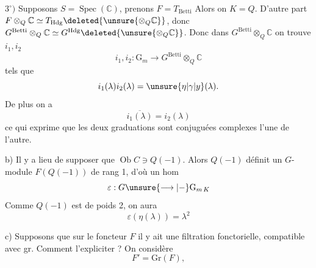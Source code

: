 $3^\circ)$ Supposons $S=\operatorname{Spec}(\mathbb C)$, prenons $F=T_{\mathrm{Betti}}$   Alors on  $K=Q$. D'autre part $F\otimes_Q\mathbb C\simeq T_{\mathrm{Hdg}}\deleted{\unsure{\otimes_Q\mathbb C}}$, donc  $G^{\mathrm{Betti}}\otimes_Q\mathbb C\simeq G^{\mathrm{Hdg}}\deleted{\unsure{\otimes_Q\mathbb C}}$. Donc dans $G^{\mathrm{Betti}}\otimes_Q\mathbb C$ on trouve  $i_1,i_2$
\[
i_1,i_2:\mathrm G_m\longrightarrow G^{\mathrm{Betti}}\otimes_Q\mathbb C
\]
tels que
\[
i_1(\lambda)i_2(\lambda)=\unsure{\eta|\gamma|y}(\lambda).
\]
De plus on a
\[
\overline{i_1(\lambda)}=i_2(\lambda)
\]
ce qui exprime que les deux graduations  sont conjuguées complexes l'une de l'autre.

b) Il y a lieu de supposer que $\operatorname{Ob}C\ni Q(-1)$. Alors $Q(-1)$  définit un $G$-module $F(Q(-1))$ de rang 1, d'où un hom
\[
\varepsilon:G\unsure{\longrightarrow|-}\mathrm G_{m\,K}
\]
Comme $Q(-1)$ est de  poids 2, on aura
\[
\boxed{\varepsilon(\eta(\lambda))=\lambda^2}
\]

c) Supposons que sur le foncteur $F$ il y ait une filtration fonctorielle, compatible avec gr. Comment l'expliciter ? On considère
\[
F'=\mathrm{Gr}(F),
\]


